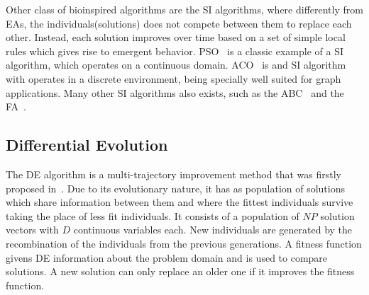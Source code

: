 Other class of bioinspired algorithms are the \ac{SI} algorithms, where differently from
\ac{EA}s, the individuals(solutions) does not compete between them to replace each other.
Instead, each solution improves over time based on a set of simple local rules which
gives rise to emergent behavior. \ac{PSO}~\cite{eberhart1995new} is a classic
example of a \ac{SI} algorithm, which operates on a continuous domain.
\ac{ACO}~\cite{dorigo1997ant} is and SI algorithm with operates in a discrete environment, being specially
well suited for graph applications. Many other \ac{SI} algorithms also exists, such
as the \ac{ABC}~\cite{karaboga2007powerful} and the
\ac{FA}~\cite{yang2009firefly}.


\subsection{Differential Evolution} \label{sec:de}

The \ac{DE} algorithm is a
multi-trajectory improvement method that was firstly proposed in~\cite{storn1997differential}.
Due to its evolutionary nature, it has as population of solutions which share information
between them and where the fittest individuals survive taking the place of less fit individuals.
It consists of a population of $NP$ solution vectors with $D$ continuous variables each.
New individuals are generated by the recombination of the individuals
from the previous generations. A fitness function givens \ac{DE} information about the
problem domain and is used to compare solutions. A new solution can only replace
an older one if it improves the fitness function.


